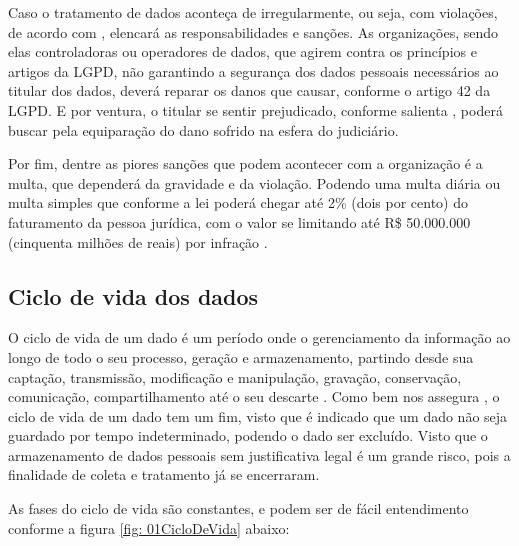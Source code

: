 \documentclass[
	12pt,				%
	openright,			%
	oneside,			%
	a4paper,			%
	english,			%
	french,				%
	spanish,			%
	brazil,				%
	]{abntex2}
\begin{document}
Caso o tratamento de dados aconteça de irregularmente, ou seja, com violações, de acordo com  , elencará as responsabilidades e sanções. As organizações, sendo elas controladoras ou operadores de dados, que agirem contra os princípios e artigos da LGPD, não garantindo a segurança dos dados pessoais necessários ao titular dos dados, deverá reparar os danos que causar, conforme o artigo 42 da LGPD. E por ventura, o titular se sentir prejudicado, conforme salienta , poderá buscar pela equiparação do dano sofrido na esfera do judiciário.

Por fim, dentre as piores sanções que podem acontecer com a organização é a multa, que dependerá da gravidade e da violação. Podendo uma multa diária ou multa simples que conforme a lei poderá chegar até 2\% (dois por cento) do faturamento da pessoa jurídica, com o valor se limitando até R\$ 50.000.000 (cinquenta milhões de reais) por infração \cite{01-01-LeiGeral}. 


\subsection{Ciclo de vida dos dados}
O ciclo de vida de um dado é um período onde o gerenciamento da informação ao longo de todo o seu processo, geração e armazenamento, partindo desde sua captação, transmissão, modificação e manipulação, gravação, conservação, comunicação, compartilhamento até o seu descarte \cite{Pinheiro2021}. Como bem nos assegura , o ciclo de vida de um dado tem um fim, visto que é indicado que um dado não seja guardado por tempo indeterminado, podendo o dado ser excluído. Visto que o armazenamento de dados pessoais sem justificativa legal é um grande risco, pois a finalidade de coleta e tratamento já se encerraram.

As fases do ciclo de vida são constantes, e podem ser de fácil entendimento conforme a figura \ref{fig: 01CicloDeVida} abaixo:
\end{document}
